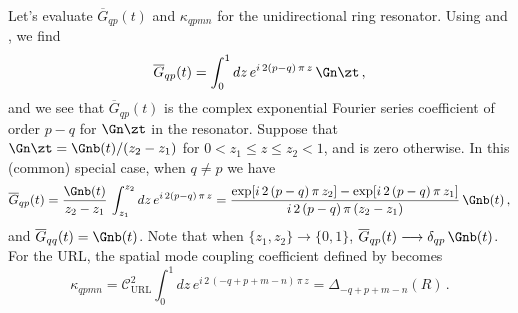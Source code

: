 Let's evaluate $\overline{G}_{q p}(t)$ and $\kappa_{q p m n}$ for the unidirectional ring resonator. Using  and , we find
\begin{equation} %
    \overline{G}_{q p}(t) = \int_{0}^{1} d z\, e^{i\, 2 (p - q)\, \pi\, z}\, \Gn\zt\, ,
\end{equation}
and we see that $\overline{G}_{q p}(t)$ is the complex exponential Fourier series coefficient of order $p - q$ for $\Gn\zt$ in the resonator. Suppose that $\Gn\zt = \Gnb(t)/(z_2 - z_1)$ for $0 < z_1 \le z \le z_2 < 1$, and is zero otherwise. In this (common) special case, when $q \ne p$ we have
\begin{equation} %
    \overline{G}_{q p}(t) = \frac{\Gnb(t)}{z_2 - z_1}\, \int_{z_1}^{z_2} d z\, e^{i\, 2 (p - q)\, \pi\, z} = \frac{\exp[i\, 2 \left(p - q\right) \pi\, z_2] - \exp[i\, 2 \left(p - q\right) \pi\, z_1]}{i\, 2 \left(p - q\right) \pi \left(z_2 - z_1\right)} \, \Gnb(t)\, ,
\end{equation}
and $\overline{G}_{q q}(t) = \Gnb(t)$. Note that when $\{z_1, z_2\} \longrightarrow \{0, 1\}$, $\overline{G}_{q p}(t) \longrightarrow \delta_{q p}\, \Gnb(t)$.
For the URL, the spatial mode coupling coefficient defined by  becomes
\begin{equation}
  \label{eqn:mml_1d_kqpmn_url}
  \kappa_{q p m n} = \mathcal{C}^2_\mathrm{URL} \int_0^1 d z\, e^{i\, 2\, (-q + p + m - n)\, \pi\, z} = \Delta_{-q + p + m - n}(R)\, .
\end{equation}


